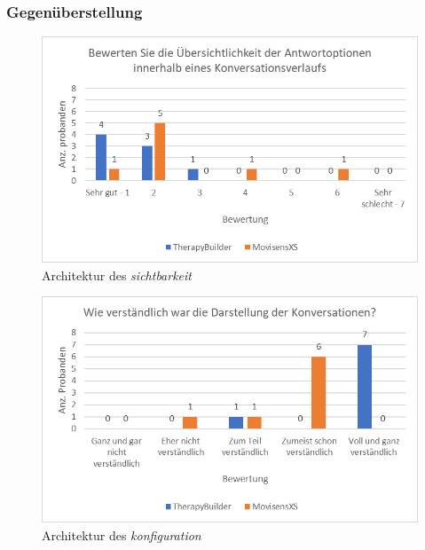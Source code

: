\subsubsection{Gegenüberstellung}

\begin{figure}[!h]
\centering
\includegraphics[width=1\textwidth]{pictures/diagramme/antwortoptkonv}
\caption{Architektur des \emph{sichtbarkeit}}
\label{antwortoptkonv}
\end{figure}

\begin{figure}[!h]
\centering
\includegraphics[width=1\textwidth]{pictures/diagramme/konversationdarstellung}
\caption{Architektur des \emph{konfiguration}}
\label{konversationdarstellung}
\end{figure}


